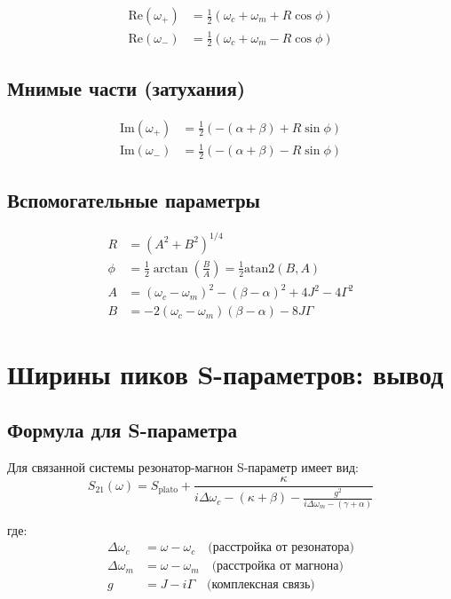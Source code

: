 \documentclass[12pt,a4paper]{article}
\begin{document}
\begin{align}
\text{Re}(\omega_+) &= \frac{1}{2}\left(\omega_c + \omega_m + R\cos\phi\right) \\
\text{Re}(\omega_-) &= \frac{1}{2}\left(\omega_c + \omega_m - R\cos\phi\right)
\end{align}

\subsection{Мнимые части (затухания)}

\begin{align}
\text{Im}(\omega_+) &= \frac{1}{2}\left(-(\alpha + \beta) + R\sin\phi\right) \\
\text{Im}(\omega_-) &= \frac{1}{2}\left(-(\alpha + \beta) - R\sin\phi\right)
\end{align}

\subsection{Вспомогательные параметры}

\begin{align}
R &= (A^2 + B^2)^{1/4} \\
\phi &= \frac{1}{2}\arctan\left(\frac{B}{A}\right) = \frac{1}{2}\text{atan2}(B, A) \\
A &= (\omega_c - \omega_m)^2 - (\beta - \alpha)^2 + 4J^2 - 4\Gamma^2 \\
B &= -2(\omega_c - \omega_m)(\beta - \alpha) - 8J\Gamma
\end{align}

\section{Ширины пиков S-параметров: вывод}

\subsection{Формула для S-параметра}

Для связанной системы резонатор-магнон S-параметр имеет вид:
\begin{equation}
S_{21}(\omega) = S_{\text{plato}} + \frac{\kappa}{i\Delta\omega_c - (\kappa+\beta) - \frac{g^2}{i\Delta\omega_m - (\gamma+\alpha)}}
\end{equation}

где:
\begin{align*}
\Delta\omega_c &= \omega - \omega_c \quad \text{(расстройка от резонатора)} \\
\Delta\omega_m &= \omega - \omega_m \quad \text{(расстройка от магнона)} \\
g &= J - i\Gamma \quad \text{(комплексная связь)}
\end{align*}
\end{document}
